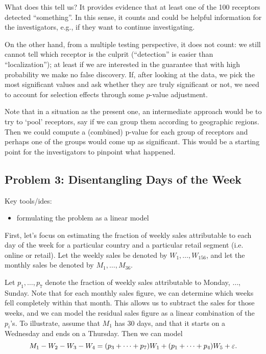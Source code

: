 \begin{enumerate}
What does this tell us? It provides evidence that at least one of the 100 receptors detected ``something''. In this sense, it counts and could be helpful information for the investigators, e.g., if they want to continue investigating.

On the other hand, from a multiple testing perspective, it does not count: we still cannot tell which receptor is the culprit (``detection'' is easier than ``localization''); at least if we are interested in the guarantee that with high probability we make no false discovery. If, after looking at the data, we pick the most significant values and ask whether they are truly significant or not, we need to account for selection effects through some $p$-value adjustment.

Note that in a situation as the present one, an intermediate approach would be to try to `pool' receptors, say if we can group them according to geographic regions. Then we could compute a (combined) p-value for each group of receptors and perhaps one of the groups would come up as significant. This would be a starting point for the investigators to pinpoint what happened.

\end{enumerate}
	  

\subsection*{Problem 3: Disentangling Days of the Week}
Key tools/ides:
\begin{itemize}
\item formulating the problem as a linear model
\end{itemize}

First, let's focus on estimating the fraction of weekly sales attributable to each day of the week for a particular country and a particular retail segment (i.e. online or retail). Let the weekly sales be denoted by $W_1, \dots, W_{156}$, and let the monthly sales be denoted by $M_1, \dots, M_{36}$.

Let $p_1, \dots, p_7$ denote the fraction of weekly sales attributable to Monday, $\dots$, Sunday. Note that for each monthly sales figure, we can determine which weeks fell completely within that month. This allows us to subtract the sales for those weeks, and we can model the residual sales figure as a linear combination of the $p_i$'s. To illustrate, assume that $M_1$ has 30 days, and that it starts on a Wednesday and ends on a Thursday. Then we can model
\begin{equation}\label{eq:2017Q3_month_update}
M_1 - W_2 - W_3 - W_4 =  (p_3 + \dots + p_7) W_1 + (p_1 + \dots + p_4) W_5+ {\varepsilon}.
\end{equation}

